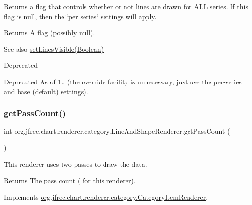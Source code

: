 Returns a flag that controls whether or not lines are drawn for A\+LL series. If this flag is {\ttfamily null}, then the \char`\"{}per series\char`\"{} settings will apply.

\begin{DoxyReturn}{Returns}
A flag (possibly {\ttfamily null}).
\end{DoxyReturn}
\begin{DoxySeeAlso}{See also}
\mbox{\hyperlink{classorg_1_1jfree_1_1chart_1_1renderer_1_1category_1_1_line_and_shape_renderer_ac17bb2a4b2553880625859d5f09c88e4}{set\+Lines\+Visible(\+Boolean)}}
\end{DoxySeeAlso}
\begin{DoxyRefDesc}{Deprecated}
\item[\mbox{\hyperlink{deprecated__deprecated000186}{Deprecated}}]As of 1.. (the override facility is unnecessary, just use the per-\/series and base (default) settings). \end{DoxyRefDesc}
\mbox{\label{classorg_1_1jfree_1_1chart_1_1renderer_1_1category_1_1_line_and_shape_renderer_a1bce5bacad7ef3f3582ae42f0d79b5cb}} 
\subsubsection{\texorpdfstring{get\+Pass\+Count()}{getPassCount()}}
{\footnotesize\ttfamily int org.\+jfree.\+chart.\+renderer.\+category.\+Line\+And\+Shape\+Renderer.\+get\+Pass\+Count (\begin{DoxyParamCaption}{ }\end{DoxyParamCaption})}

This renderer uses two passes to draw the data.

\begin{DoxyReturn}{Returns}
The pass count ({} for this renderer). 
\end{DoxyReturn}


Implements \mbox{\hyperlink{interfaceorg_1_1jfree_1_1chart_1_1renderer_1_1category_1_1_category_item_renderer_aa8cd580a0e3836808f97f479f2c999bc}{org.\+jfree.\+chart.\+renderer.\+category.\+Category\+Item\+Renderer}}.

